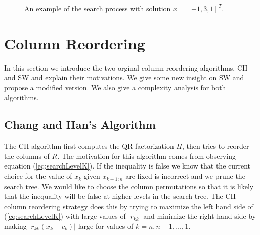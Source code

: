 \documentclass[conference]{IEEEtran}
\begin{document}
\begin{figure}

\caption{An example of the search process with solution $x = [-1,3,1]^T$.}
\label{fig:treeSearch}
\end{figure}

\section{Column Reordering}
In this section we  introduce the two orginal column reordering algorithms, CH and
SW and explain their motivations.
We give some new insight on SW and propose a modified version.
We also give a complexity analysis for both algorithms.

\subsection{Chang and Han's Algorithm}
The CH algorithm first computes the QR factorization $H$,
then  tries to reorder the columns of $R$.
The motivation for this algorithm comes from observing equation (\ref{eq:searchLevelK}).
If the inequality is false we know that the current choice for the value of
$x_k$ given $x_{k+1:n}$ are fixed is incorrect and we prune the search tree. We
would like to choose the column permutations so that it is likely that the
inequality will be false at higher levels in the search tree. The CH column reordering strategy
does this by trying to maximize the left hand side of  (\ref{eq:searchLevelK}) with large values of $\left | r_{kk}
\right |$ and minimize the right hand side by making $\left | r_{kk}(x_k-c_k) \right |$
large for values of $k = n,n-1, \dots, 1$.
\end{document}
